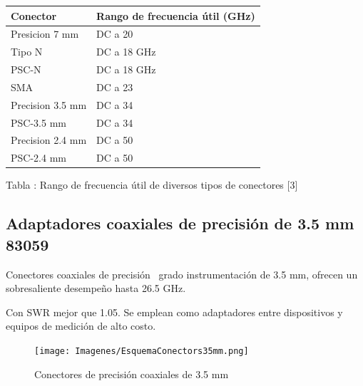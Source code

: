 \documentclass{article}
\begin{document}
	\begin{center}
		\tablefirsthead{}
		\tablehead{}
		\tabletail{}
		\tablelasttail{}
		\begin{supertabular}{|m{2.756cm}|m{5.1660004cm}|}
			\hline
			\centering Conector &
			\centering Rango de frecuencia útil (GHz)\\\hline
			\centering Presicion 7 mm &
			\centering DC a 20\\\hline
			\centering Tipo N &
			\centering DC a 18 GHz\\\hline
			\centering PSC-N &
			\centering DC a 18 GHz\\\hline
			\centering SMA &
			\centering DC a 23\\\hline
			\centering Precision 3.5 mm &
			\centering DC a 34\\\hline
			\centering PSC-3.5 mm &
			\centering DC a 34\\\hline
			\centering Precision 2.4 mm &
			\centering DC a 50\\\hline
			\centering PSC-2.4 mm &
			\centering DC a 50\\\hline
		\end{supertabular}
	\end{center}

	Tabla : Rango de frecuencia útil de diversos tipos de conectores [3]		
	\subsection{Adaptadores coaxiales de precisión de 3.5 mm 83059}
	
	Conectores coaxiales de precisión \ grado instrumentación de 3.5 mm, ofrecen un sobresaliente desempeño hasta 26.5 GHz.
	
	Con SWR mejor que 1.05. Se emplean como adaptadores entre dispositivos y equipos de medición de alto costo. 	
	
	\begin{figure}
		\centering
		\begin{minipage}{15.656cm}				
			\texttt{[image: Imagenes/EsquemaConectors35mm.png]}
			\caption{Conectores de precisión coaxiales de 3.5 mm}
			\label{Fig:ConectoresPrecision35mm}
		\end{minipage}
	\end{figure}
			
\end{document}
